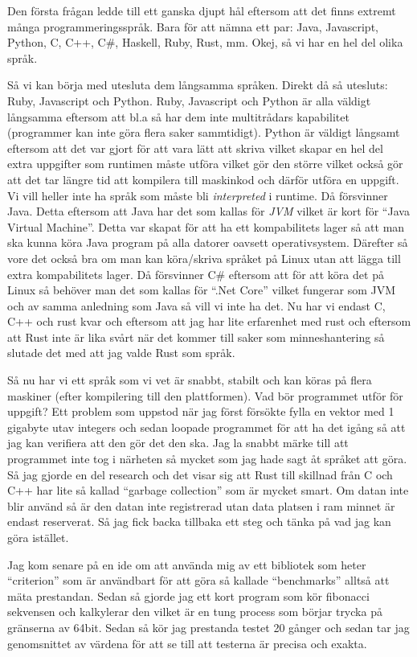 \documentclass[12pt, a4paper]{report}
\begin{document}
Den första frågan ledde till ett ganska djupt hål eftersom att det finns extremt många programmeringsspråk. Bara för att nämna ett par: Java, Javascript, Python, C, C++, C\#, Haskell, Ruby, Rust, mm. Okej, så vi har en hel del olika språk.
 
Så vi kan börja med utesluta dem långsamma språken. Direkt då så utesluts: Ruby, Javascript och Python. Ruby, Javascript och Python är alla väldigt långsamma eftersom att bl.a så har dem inte multitrådars kapabilitet (programmer kan inte göra flera saker sammtidigt). Python är väldigt långsamt eftersom att det var gjort för att vara lätt att skriva vilket skapar en hel del extra uppgifter som runtimen måste utföra vilket gör den större vilket också gör att det tar längre tid att kompilera till maskinkod och därför utföra en uppgift. Vi vill heller inte ha språk som måste bli \textit{interpreted} i runtime. Då försvinner Java. Detta eftersom att Java har det som kallas för \textit{JVM} vilket är kort för ``Java Virtual Machine''. Detta var skapat för att ha ett kompabilitets lager så att man ska kunna köra Java program på alla datorer oavsett operativsystem. Därefter så vore det också bra om man kan köra/skriva språket på Linux utan att lägga till extra kompabilitets lager. Då försvinner C\# eftersom att för att köra det på Linux så behöver man det som kallas för ``.Net Core'' vilket fungerar som JVM och av samma anledning som Java så vill vi inte ha det. Nu har vi endast C, C++ och rust kvar och eftersom att jag har lite erfarenhet med rust och eftersom att Rust inte är lika svårt när det kommer till saker som minneshantering så slutade det med att jag valde Rust som språk.
 
 
Så nu har vi ett språk som vi vet är snabbt, stabilt och kan köras på flera maskiner (efter kompilering till den plattformen). Vad bör programmet utför för uppgift? Ett problem som uppstod när jag först försökte fylla en vektor med 1 gigabyte utav integers och sedan loopade programmet för att ha det igång så att jag kan verifiera att den gör det den ska. Jag la snabbt märke till att programmet inte tog i närheten så mycket som jag hade sagt åt språket att göra. Så jag gjorde en del research och det visar sig att Rust till skillnad från C och C++ har lite så kallad ``garbage collection'' som är mycket smart. Om datan inte blir använd så är den datan inte registrerad utan data platsen i ram minnet är endast reserverat. Så jag fick backa tillbaka ett steg och tänka på vad jag kan göra istället.
 
Jag kom senare på en ide om att använda mig av ett bibliotek som heter ``criterion'' som är användbart för att göra så kallade ``benchmarks'' alltså att mäta prestandan. Sedan så gjorde jag ett kort program som kör fibonacci sekvensen och kalkylerar den vilket är en tung process som börjar trycka på gränserna av 64bit. Sedan så kör jag prestanda testet 20 gånger och sedan tar jag genomsnittet av värdena för att se till att testerna är precisa och exakta.
 
\end{document}
